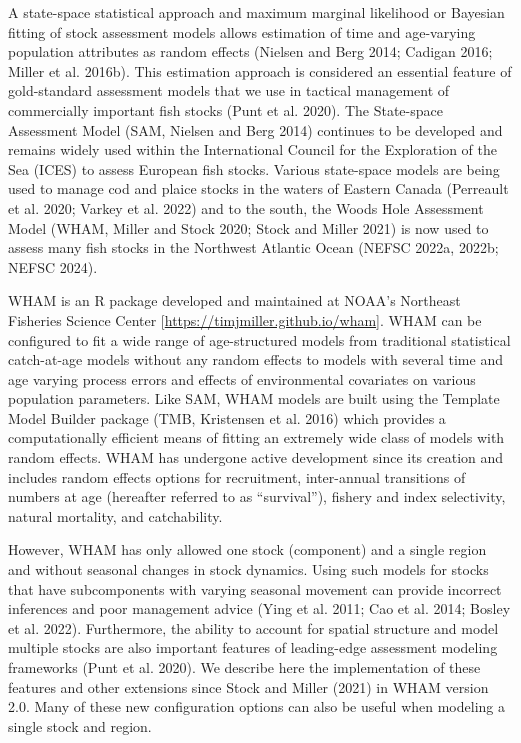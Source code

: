 \documentclass[
]{article}
\begin{document}
A state-space statistical approach and maximum marginal likelihood or
Bayesian fitting of stock assessment models allows estimation of time
and age-varying population attributes as random effects (Nielsen and
Berg 2014; Cadigan 2016; Miller et al. 2016b). This estimation approach
is considered an essential feature of gold-standard assessment models
that we use in tactical management of commercially important fish stocks
(Punt et al. 2020). The State-space Assessment Model (SAM, Nielsen and
Berg 2014) continues to be developed and remains widely used within the
International Council for the Exploration of the Sea (ICES) to assess
European fish stocks. Various state-space models are being used to
manage cod and plaice stocks in the waters of Eastern Canada (Perreault
et al. 2020; Varkey et al. 2022) and to the south, the Woods Hole
Assessment Model (WHAM, Miller and Stock 2020; Stock and Miller 2021) is
now used to assess many fish stocks in the Northwest Atlantic Ocean
(NEFSC 2022a, 2022b; NEFSC 2024).

WHAM is an R package developed and maintained at NOAA's Northeast
Fisheries Science Center {[}\url{https://timjmiller.github.io/wham}{]}.
WHAM can be configured to fit a wide range of age-structured models from
traditional statistical catch-at-age models without any random effects
to models with several time and age varying process errors and effects
of environmental covariates on various population parameters. Like SAM,
WHAM models are built using the Template Model Builder package (TMB,
Kristensen et al. 2016) which provides a computationally efficient means
of fitting an extremely wide class of models with random effects. WHAM
has undergone active development since its creation and includes random
effects options for recruitment, inter-annual transitions of numbers at
age (hereafter referred to as ``survival''), fishery and index
selectivity, natural mortality, and catchability.

However, WHAM has only allowed one stock (component) and a single region
and without seasonal changes in stock dynamics. Using such models for
stocks that have subcomponents with varying seasonal movement can
provide incorrect inferences and poor management advice (Ying et al.
2011; Cao et al. 2014; Bosley et al. 2022). Furthermore, the ability to
account for spatial structure and model multiple stocks are also
important features of leading-edge assessment modeling frameworks (Punt
et al. 2020). We describe here the implementation of these features and
other extensions since Stock and Miller (2021) in WHAM version 2.0. Many
of these new configuration options can also be useful when modeling a
single stock and region.
\end{document}
